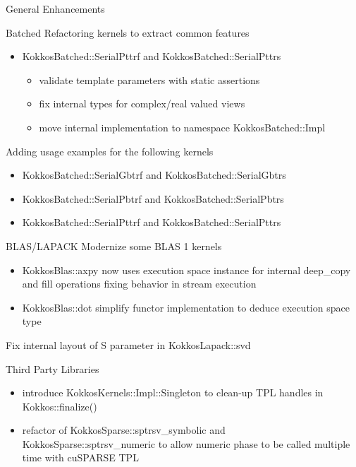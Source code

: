 \begin{frame}[fragile]

  {\Huge General Enhancements}

  \vspace{10pt}

\end{frame}

\begin{frame}[fragile]{Batched}
  Refactoring kernels to extract common features
  \begin{itemize}
  \item {\ttfamily KokkosBatched::SerialPttrf} and {\ttfamily KokkosBatched::SerialPttrs}
    \begin{itemize}
    \item validate template parameters with static assertions
    \item fix internal types for complex/real valued views
    \item move internal implementation to {\ttfamily namespace KokkosBatched::Impl}
    \end{itemize}
  \end{itemize}
  Adding usage examples for the following kernels
  \begin{itemize}
  \item {\ttfamily KokkosBatched::SerialGbtrf} and {\ttfamily KokkosBatched::SerialGbtrs}
  \item {\ttfamily KokkosBatched::SerialPbtrf} and {\ttfamily KokkosBatched::SerialPbtrs}
  \item {\ttfamily KokkosBatched::SerialPttrf} and {\ttfamily KokkosBatched::SerialPttrs}
  \end{itemize}
\end{frame}

\begin{frame}[fragile]{BLAS/LAPACK}
  Modernize some BLAS 1 kernels
  \begin{itemize}
  \item {\ttfamily KokkosBlas::axpy} now uses execution space instance for internal {\ttfamily deep\_copy} and fill operations fixing behavior in stream execution
  \item {\ttfamily KokkosBlas::dot} simplify functor implementation to deduce execution space type
  \end{itemize}
  Fix internal layout of {\ttfamily S} parameter in {\ttfamily KokkosLapack::svd}
\end{frame}

\begin{frame}[fragile]{Third Party Libraries}
  \begin{itemize}
  \item introduce {\ttfamily KokkosKernels::Impl::Singleton} to clean-up TPL handles in {\ttfamily Kokkos::finalize()}
  \item refactor of {\ttfamily KokkosSparse::sptrsv\_symbolic} and {\ttfamily KokkosSparse::sptrsv\_numeric} to allow numeric phase to be called multiple time with cuSPARSE TPL
  \end{itemize}
\end{frame}

